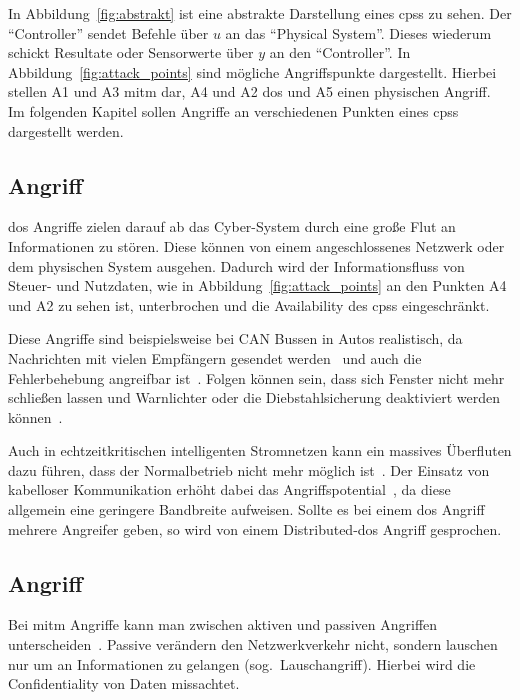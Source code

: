 \documentclass[final,bibliography=totocnumbered]{include/sikseminar}
\newcommand{\cps}{\glspl{cps}\xspace}
\begin{document}
    In Abbildung~\ref{fig:abstrakt} ist eine abstrakte Darstellung eines \cps zu sehen.
    Der \enquote{Controller} sendet Befehle über $u$ an das \enquote{Physical System}.
    Dieses wiederum schickt Resultate oder Sensorwerte über $y$ an den \enquote{Controller}.
    In Abbildung~\ref{fig:attack_points} sind mögliche Angriffspunkte dargestellt.
    Hierbei stellen A1 und A3 \gls{mitm} dar, A4 und A2 \gls{dos} und A5 einen physischen Angriff.
    Im folgenden Kapitel sollen Angriffe an verschiedenen Punkten eines \cps dargestellt werden.


    \subsection{ Angriff}
    \label{subsec:dos}
    \gls{dos} Angriffe zielen darauf ab das Cyber-System durch eine große Flut an Informationen zu stören.
    Diese können von einem angeschlossenes Netzwerk oder dem physischen System ausgehen.
    Dadurch wird der Informationsfluss von Steuer- und Nutzdaten, wie in Abbildung~\ref{fig:attack_points} an den Punkten A4 und A2 zu sehen ist, unterbrochen und die Availability des \cps eingeschränkt.

    Diese Angriffe sind beispielsweise bei CAN Bussen in Autos realistisch, da Nachrichten mit vielen Empfängern gesendet werden~\cite{KCR+10} und auch die Fehlerbehebung angreifbar ist~\cite{CDV13}.
    Folgen können sein, dass sich Fenster nicht mehr schließen lassen und Warnlichter oder die Diebstahlsicherung deaktiviert werden können~\cite{HKD08}.

    Auch in echtzeitkritischen intelligenten Stromnetzen kann ein massives Überfluten dazu führen, dass der Normalbetrieb nicht mehr möglich ist~\cite{LLW+10}.
    Der Einsatz von kabelloser Kommunikation erhöht dabei das Angriffspotential~\cite{LWW11}, da diese allgemein eine geringere Bandbreite aufweisen.
    Sollte es bei einem \gls{dos} Angriff mehrere Angreifer geben, so wird von einem Distributed-\acrlong{dos} Angriff gesprochen.


    \subsection{ Angriff}
    \label{subsec:mitm}
    Bei \gls{mitm} Angriffe kann man zwischen aktiven und passiven Angriffen unterscheiden~\cite{WYX+10}.
    Passive verändern den Netzwerkverkehr nicht, sondern lauschen nur um an Informationen zu gelangen (sog.\ Lauschangriff).
    Hierbei wird die Confidentiality von Daten missachtet.
\end{document}
